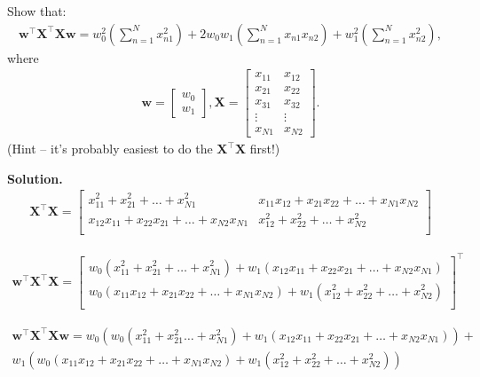 \documentclass[10pt]{article}
\begin{document}
\begin{enumerate}
Show that:
\begin{eqnarray*}
\mathbf{w}^\top\mathbf{X}^\top\mathbf{X}\mathbf{w} = w_0^2 \left( \sum_{n=1}^N x_{n1}^2 \right) + 2w_0w_1 \left( \sum_{n=1}^N x_{n1}x_{n2} \right) + w_1^2 \left( \sum_{n=1}^N x_{n2}^2 \right),
\end{eqnarray*}
where
\begin{eqnarray*}
\mathbf{w} = 
    \begin{bmatrix}
    w_0 \\[0.3em]
    w_1
    \end{bmatrix}
    ,
\mathbf{X} = 
    \begin{bmatrix}
    x_{11} & x_{12} \\[0.3em]
    x_{21} & x_{22} \\[0.3em]
    x_{31} & x_{32} \\[0.3em]
    \vdots & \vdots \\[0.3em]
    x_{N1} & x_{N2}
    \end{bmatrix}
    .
\end{eqnarray*}
(Hint -- it's probably easiest to do the $\mathbf{X}^\top\mathbf{X}$ first!)

{\bf Solution.} 
\begin{eqnarray*}
\mathbf{X}^\top\mathbf{X} = 
    \begin{bmatrix}
    x_{11}^2+x_{21}^2+\hdots+x_{N1}^2 &  x_{11}x_{12}+x_{21}x_{22}+\hdots+x_{N1}x_{N2} \\[0.3em]
    x_{12}x_{11}+x_{22}x_{21}+\hdots+x_{N2}x_{N1} &  x_{12}^2+x_{22}^2+\hdots+x_{N2}^2\\[0.3em]
    \end{bmatrix}
    \end{eqnarray*} 

\begin{eqnarray*}
\mathbf{w}^\top\mathbf{X}^\top\mathbf{X} = 
    \begin{bmatrix}
    w_0\left(x_{11}^2+x_{21}^2+\hdots+x_{N1}^2\right)+ w_1\left( x_{12}x_{11}+x_{22}x_{21}+\hdots+x_{N2}x_{N1}\right)   \\[0.3em]
    w_0\left(x_{11}x_{12}+x_{21}x_{22}+\hdots+x_{N1}x_{N2}\right)+ w_1\left(x_{12}^2+x_{22}^2+\hdots+x_{N2}^2\right) \\[0.3em]
    \end{bmatrix}^\top
    \end{eqnarray*}

\begin{eqnarray*}
\mathbf{w}^\top\mathbf{X}^\top\mathbf{X}\mathbf{w} = w_0\left( w_0\left(x_{11}^2+x_{21}^2\hdots+x_{N1}^2\right)+ w_1\left( x_{12}x_{11}+x_{22}x_{21}+\hdots+x_{N2}x_{N1}\right)\right) + \\
w_1\left( w_0\left(x_{11}x_{12}+x_{21}x_{22}+\hdots+x_{N1}x_{N2}\right)+ w_1\left(x_{12}^2+x_{22}^2+\hdots+x_{N2}^2\right)\right)
	\end{eqnarray*}
	

\end{enumerate}
\end{document}
